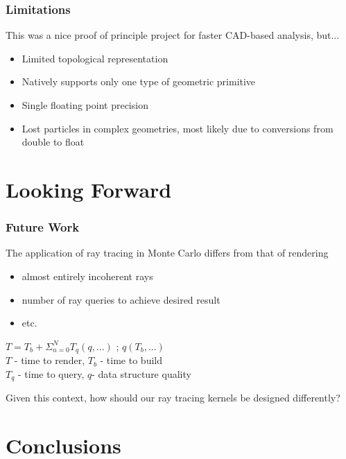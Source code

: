 \documentclass[12pt]{beamer}
\begin{document}
\begin{frame}
\frametitle{Limitations}

This was a nice proof of principle project for faster CAD-based analysis, but... \\
\vfill
\begin{itemize}
\item Limited topological representation
\item Natively supports only one type of geometric primitive
\item Single floating point precision
\item Lost particles in complex geometries, most likely due to conversions from double to float
\end{itemize}
\end{frame}

\section{Looking Forward} %

\begin{frame}

\frametitle{Future Work}

The application of ray tracing in Monte Carlo differs from that of rendering
  \begin{itemize}
    \item almost entirely incoherent rays
    \item number of ray queries to achieve desired result
    \item etc.
  \end{itemize}
\begin{center}
$T = T_b + \Sigma_{n=0}^{N} T_q(q,...)$ ; $q(T_b,...)$\\
\vfill
\small{
$T$ - time to render, $T_b$ - time to build \\
  $T_q$ - time to query, $q$- data structure quality}
\end{center}
Given this context, how should our ray tracing kernels be designed differently?

\end{frame}


\section{Conclusions}
\end{document}
